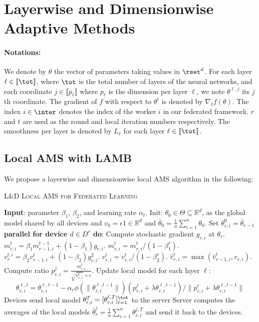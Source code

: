 \documentclass{article}
\begin{document}
\section{Layerwise and Dimensionwise Adaptive Methods}\label{sec:main}

\paragraph{Notations:} We denote by $\theta$ the vector of parameters taking values in $\rset^d$. 
For each layer $\ell \in \llbracket \tot \rrbracket$, where $\tot$ is the total number of layers of the neural networks, and each coordinate $j \in \llbracket p_\ell \rrbracket$ where $p_\ell$ is the dimension per layer $\ell$, we note $\theta^{\ell, j}$ its $j$th coordinate.
The gradient of $f$ with respect to $\theta^\ell$ is denoted by $\nabla_{\ell} f(\theta)$.
The index $i \in \inter$ denotes the index of the worker $i$ in our federated framework.
$r$ and $t$ are used as the round and local iteration numbers respectively.
The smoothness per layer is denoted by $L_\ell$ for each layer $\ell \in \llbracket \tot \rrbracket$.


\subsection{Local AMS with LAMB}

We propose a layerwise and dimensionwise local AMS algorithm in the following:

\begin{algorithm}[H]
\caption{\textsc{L\&D Local AMS for Federated Learning}} \label{alg:ldams}
\begin{algorithmic}[1]
\STATE \textbf{Input}: parameter $\beta_1$, $\beta_2$, and learning rate $\alpha_t$. 
\STATE Init: $\theta_{0} \in \Theta \subseteq \mathbb R^d $, as the global model shared by all devices and $v_{0} = \epsilon 1 \in \mathbb R^{d}$ and $\bar{\theta}_0 =  \frac{1}{n} \sum_{i=1}^n \theta_0$.
\STATE Set $\theta_{r,i}^{0} = \bar{\theta}_{r-1}$
\STATE\textbf{parallel for device $d \in D^{r}$ do}:
\STATE Compute stochastic gradient $g_{r,i}$ at $\theta_r$.
\quad \quad {}
\STATE $m^t_{r,i} = \beta_1 m^{t-1}_{r-1,i} + (1 - \beta_1) g_{r,i}$.
\STATE $m^{t}_{r,i}=m^{t}_{r,i} /\left(1-\beta_{1}^{r}\right)$.
\STATE $v^{t,i}_r = \beta_2 v^{t}_{r-1,i} + (1 - \beta_2) g_{r,i}^2$.
\STATE $v^{t}_{r,i}=v^{t}_{r,i} /\left(1-\beta_{2}^{r}\right)$.
\STATE $\hat{v}^{t}_{r,i} = \max( \hat{v}^{t}_{r-1,i} , v_{r,i} )$.
\STATE Compute ratio  $p^j_{r,i}=\frac{m^{t}_{r,i}}{\sqrt{v^{t}_{r,i}}+\epsilon}$.
\STATE Update local model for each layer $\ell$:
$$\theta_{r,i}^{\ell,t}=\theta_{r,i}^{\ell,t-1}-\alpha_{r} \phi(\|\theta_{r,i}^{\ell,t-1}\|)(p_{r,i}^{j}+\lambda \theta_{r,i}^{\ell,t-1}) / \|p_{r,i}^{\ell}+\lambda \theta_{r,i}^{\ell,t-1}\|$$
\ENDFOR
\STATE Devices send local model $\theta_{r,i}^{T} = [\theta_{r,i}^{\ell,T}]_{\ell =1}^{\tot}$ to the server
\STATE Server computes the averages of the local models $\bar{\theta}_r^j = \frac{1}{n} \sum_{i=1}^n \theta_{r,i}^{j,T}$ and send it back to the devices.
\ENDFOR
\end{algorithmic}
\end{algorithm}
\end{document}
